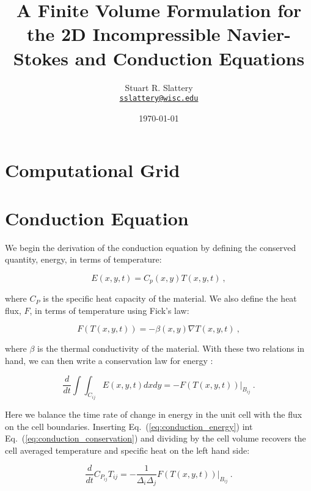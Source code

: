 \documentclass[letterpaper,12pt]{article}
\author{Stuart R. Slattery
\\ \href{mailto:sslattery@wisc.edu}{\texttt{sslattery@wisc.edu}}
}
\date{\today}
\title{A Finite Volume Formulation for the 2D Incompressible
  Navier-Stokes and Conduction Equations}
\begin{document}
\maketitle

\section{Computational Grid}

\section{Conduction Equation}
We begin the derivation of the conduction equation by defining the
conserved quantity, energy, in terms of temperature:

\begin{equation}
  E(x,y,t) = C_p(x,y) T(x,y,t)\:,
  \label{eq:conduction_energy}
\end{equation}

where $C_P$ is the specific heat capacity of the material. We also
define the heat flux, $F$, in terms of temperature using Fick's law:

\begin{equation}
  F(T(x,y,t)) = -\beta(x,y) \nabla T(x,y,t)\:,
  \label{eq:conduction_ficks_law}
\end{equation}

where $\beta$ is the thermal conductivity of the material. With these
two relations in hand, we can then write a conservation law for energy
\cite{leveque_2002}:

\begin{equation}
  \frac{d}{dt} \int \int_{C_{ij}} E(x,y,t) dx dy = -F(T(x,y,t)) |_{B_{ij}}\:.
  \label{eq:conduction_conservation}
\end{equation}

Here we balance the time rate of change in energy in the unit cell
with the flux on the cell boundaries. Inserting
Eq.~(\ref{eq:conduction_energy}) int
Eq.~(\ref{eq:conduction_conservation}) and dividing by the cell volume
recovers the cell averaged temperature and specific heat on the left
hand side:

\begin{equation}
  \frac{d}{dt} C_{P_{ij}} T_{ij} = -\frac{1}{\Delta_i
    \Delta_j}F(T(x,y,t)) |_{B_{ij}}\:.
  \label{eq:conduction_cell_averaged}
\end{equation}
\end{document}
